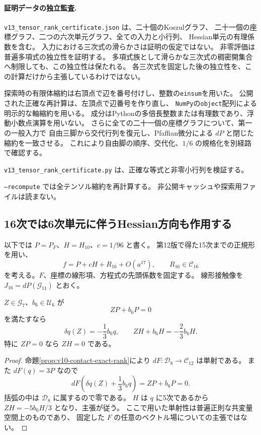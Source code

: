 \paragraph{証明データの独立監査.}
\texttt{v13\_tensor\_rank\_certificate.json} は、二十個のKoszulグラフ、
二十一個の座標グラフ、二つの六次単元グラフ、全ての入力と小行列、
Hessian単元の有理係数を含む。
入力における三次式の滑らかさは証明の仮定ではない。
非零評価は普遍多項式の独立性を証明する。
多項式族として滑らかな三次式の稠密開集合へ制限しても、この独立性は保たれる。
各三次式を固定した後の独立性を、この計算だけから主張しているわけではない。

探索時の有限体縮約は右頂点で辺を番号付けし、整数の\texttt{einsum}を用いた。
公開された正確な再計算は、左頂点で辺番号を作り直し、
\texttt{NumPy}の\texttt{object}配列による明示的な軸縮約を用いる。
成分はPythonの多倍長整数または有理数であり、浮動小数点演算を用いない。
さらに全ての二十一個の座標グラフについて、第一の一般入力で
自由三脚から交代行列を復元し、Pfaffian微分による $dP$ と閉じた縮約を一致させる。
これにより自由脚の順序、交代化、$1/6$ の規格化を別経路で確認する。

\texttt{v13\_tensor\_rank\_certificate.py} は、正確な等式と非零小行列を検証する。

\texttt{--recompute} では全テンソル縮約を再計算する。
非公開キャッシュや探索用ファイルは読まない。

\subsection{16次では6次単元に伴うHessian方向も作用する}
\label{subsec:v13-filtered-contact}

以下では $P=P_F$、$H=H_{10}$、$c=1/96$ と書く。
第12版で得た15次までの正規形を用い、
\[
 f=P+cH+R_{16}+O(a^{17}),\qquad R_{16}\in\mathcal C_{16}
\]
を考える。$F$、座標の線形項、方程式の先頭係数を固定する。
線形接触像を $J_{16}=dP(\mathcal G_{11})$ とおく。

\begin{lemma}[7次の接触安定化群のHessian作用]
\label{lem:v13-seventh-stabilizer}
$Z\in\mathcal G_7$、$b_6\in\mathcal U_6$ が
\[
 ZP+b_6P=0
\]
を満たすなら
\[
 \delta q(Z)=-\frac13b_6q,\qquad
 ZH+b_6H=-\frac23b_6H.
\]
特に $ZP=0$ なら $ZH=0$ である。
\end{lemma}
\begin{proof}
命題\ref{prop:v10-contact-exact-rank}により
$dF:\mathcal D_8\to\mathcal C_{12}$ は単射である。
また $dF(q)=3P$ なので
\[
 dF\left(\delta q(Z)+\frac13b_6q\right)=ZP+b_6P=0.
\]
括弧の中は $\mathcal D_8$ に属するので零である。
$H$ は $q$ に5次であるから
$ZH=-5b_6H/3$ となり、主張が従う。
ここで用いた単射性は普遍正則な共変量空間上のものであり、
固定した $F$ の任意のベクトル場についての主張ではない。
\end{proof}

